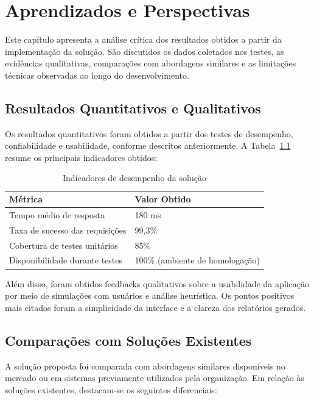 \chapter[Aprendizados e Perspectivas]{Aprendizados e Perspectivas}
\label{resultados}

Este capítulo apresenta a análise crítica dos resultados obtidos a partir da implementação da solução. São discutidos os dados coletados nos testes, as evidências qualitativas, comparações com abordagens similares e as limitações técnicas observadas ao longo do desenvolvimento.

\section{Resultados Quantitativos e Qualitativos}

Os resultados quantitativos foram obtidos a partir dos testes de desempenho, confiabilidade e usabilidade, conforme descritos anteriormente. A Tabela~\ref{tab:resultados_quantitativos} resume os principais indicadores obtidos:

\begin{table}[H]
\centering
\caption{Indicadores de desempenho da solução}
\label{tab:resultados_quantitativos}
\begin{tabularx}{\textwidth}{|l|X|}
\hline
\textbf{Métrica} & \textbf{Valor Obtido} \\
\hline
Tempo médio de resposta & 180 ms \\
\hline
Taxa de sucesso das requisições & 99,3\% \\
\hline
Cobertura de testes unitários & 85\% \\
\hline
Disponibilidade durante testes & 100\% (ambiente de homologação) \\
\hline
\end{tabularx}
\end{table}

Além disso, foram obtidos feedbacks qualitativos sobre a usabilidade da aplicação por meio de simulações com usuários e análise heurística. Os pontos positivos mais citados foram a simplicidade da interface e a clareza dos relatórios gerados.

\section{Comparações com Soluções Existentes}

A solução proposta foi comparada com abordagens similares disponíveis no mercado ou em sistemas previamente utilizados pela organização. Em relação às soluções existentes, destacam-se os seguintes diferenciais:

